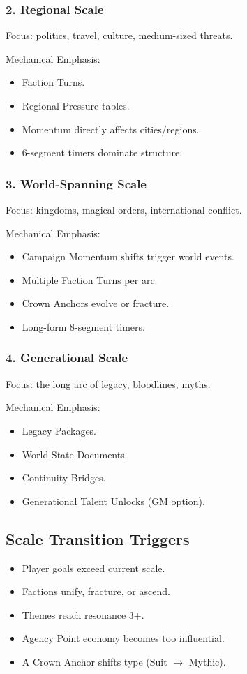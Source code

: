 \documentclass[11pt]{article}
\begin{document}
\subsubsection{2. Regional Scale}
Focus: politics, travel, culture, medium-sized threats.

Mechanical Emphasis:
\begin{itemize}
    \item Faction Turns.
    \item Regional Pressure tables.
    \item Momentum directly affects cities/regions.
    \item 6-segment timers dominate structure.
\end{itemize}

\subsubsection{3. World-Spanning Scale}
Focus: kingdoms, magical orders, international conflict.

Mechanical Emphasis:
\begin{itemize}
    \item Campaign Momentum shifts trigger world events.
    \item Multiple Faction Turns per arc.
    \item Crown Anchors evolve or fracture.
    \item Long-form 8-segment timers.
\end{itemize}

\subsubsection{4. Generational Scale}
Focus: the long arc of legacy, bloodlines, myths.

Mechanical Emphasis:
\begin{itemize}
    \item Legacy Packages.
    \item World State Documents.
    \item Continuity Bridges.
    \item Generational Talent Unlocks (GM option).
\end{itemize}

\subsection{Scale Transition Triggers}

\begin{itemize}
    \item Player goals exceed current scale.
    \item Factions unify, fracture, or ascend.
    \item Themes reach resonance 3+.
    \item Agency Point economy becomes too influential.
    \item A Crown Anchor shifts type (Suit $\rightarrow$ Mythic).
\end{itemize}
\end{document}
